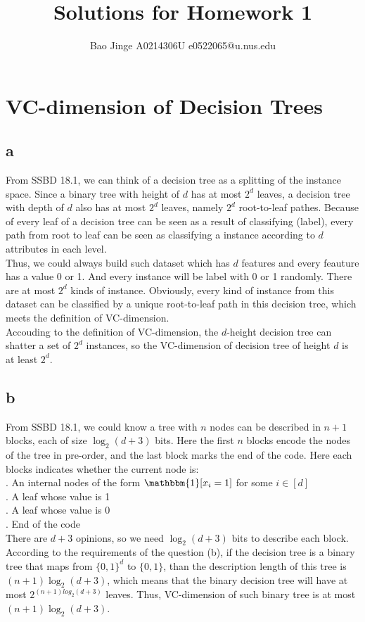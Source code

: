 \documentclass{article}
\author{Bao Jinge A0214306U e0522065@u.nus.edu}
\title{Solutions for Homework 1}
\date{}
\begin{document}
	\maketitle
	\section{VC-dimension of Decision Trees}
	\subsection{a}
	From SSBD 18.1, we can think of a decision tree as a splitting of the instance space. Since a binary tree with height of $d$ has at most $2^d$ leaves, a decision tree with depth of $d$ also has at most $2^d$ leaves, namely $2^d$ root-to-leaf pathes. Because of every leaf of a decision tree can be seen as a result of classifying (label), every path from root to leaf can be seen as classifying a instance according to $d$ attributes in each level.\\
	Thus, we could always build such dataset which has $d$ features and every feauture has a value 0 or 1. And every instance will be label with 0 or 1 randomly. There are at most $2^d$ kinds of instance. Obviously, every kind of instance from this dataset can be classified by a unique root-to-leaf path in this decision tree, which meets the definition of VC-dimension.\\
	Accouding to the definition of VC-dimension, the $d$-height decision tree can shatter a set of $2^d$ instances, so the VC-dimension of decision tree of height $d$ is at least $2^d$.\\

	\subsection{b}
	From SSBD 18.1, we could know a tree with $n$ nodes can be described in $n+1$ blocks, each of size $\log_{2}(d+3)$ bits. Here the first $n$ blocks encode the nodes of the tree in pre-order, and the last block marks the end of the code. Here each blocks indicates whether the current node is:\\
	. An internal nodes of the form $\mathbbm{1}[x_i=1]$ for some $i \in [d]$\\
	. A leaf whose value is 1\\
	. A leaf whose value is 0\\
	. End of the code\\
	There are $d+3$ opinions, so we need $\log_{2}(d+3)$ bits to describe each block.
	According to the requirements of the question (b), if the decision tree is a binary tree that maps from $\{0,1\}^d$ to $\{0,1\}$, than the description length of this tree is $(n+1)\log_2(d+3)$, which means that the binary decision tree will have at most $2^{(n+1)log_2(d+3)}$ leaves. Thus, VC-dimension of such binary tree is at most $(n+1)\log_2(d+3)$.
\end{document}

